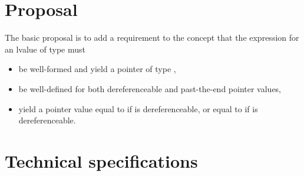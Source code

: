 \chapter{Proposal}

The basic proposal is to add a requirement to the
 concept that the expression
 for an lvalue  of type  must
\begin{itemize}
\item be well-formed and yield a pointer of type
  ,
\item be well-defined for both dereferenceable and past-the-end pointer values,
\item yield a pointer value equal to  if  is
  dereferenceable, or equal to  if 
  is dereferenceable.
\end{itemize}


\chapter{Technical specifications}
